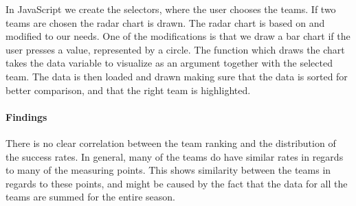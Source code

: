 \documentclass[Report.tex]{subfiles}
\begin{document}
In JavaScript we create the selectors, where the user chooses the teams. If two teams are chosen the radar chart is drawn. The radar chart is based on \cite{Radar} and modified to our needs. One of the modifications is that we draw a bar chart if the user presses a value, represented by a circle. The function which draws the chart takes the data variable to visualize as an argument together with the selected team. The data is then loaded and drawn making sure that the data is sorted for better comparison, and that the right team is highlighted.
\paragraph{Findings\\}
There is no clear correlation between the team ranking and the distribution of the success rates. In general, many of the teams do have similar rates in regards to many of the measuring points. This shows similarity between the teams in regards to these points, and might be caused by the fact that the data for all the teams are summed for the entire season.
\end{document}
